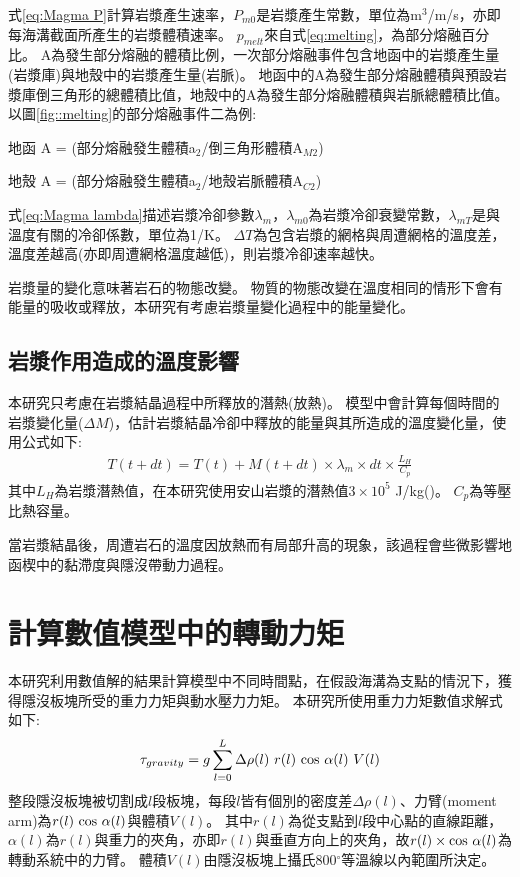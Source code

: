 式\ref{eq:Magma P}計算岩漿產生速率，$P_{m0}$是岩漿產生常數，單位為m$^3$/m/s，亦即每海溝截面所產生的岩漿體積速率。
$p_{melt}$來自式\ref{eq:melting}，為部分熔融百分比。
A為發生部分熔融的體積比例，一次部分熔融事件包含地函中的岩漿產生量(岩漿庫)與地殼中的岩漿產生量(岩脈)。
地函中的A為發生部分熔融體積與預設岩漿庫倒三角形的總體積比值，地殼中的A為發生部分熔融體積與岩脈總體積比值。
以圖\ref{fig::melting}的部分熔融事件二為例:

地函 A = (部分熔融發生體積a$_2$/倒三角形體積A$_{M2}$)

地殼 A = (部分熔融發生體積a$_2$/地殼岩脈體積A$_{C2}$)


式\ref{eq:Magma lambda}描述岩漿冷卻參數$\lambda_m$，$\lambda_{m0}$為岩漿冷卻衰變常數，$\lambda_{mT}$是與溫度有關的冷卻係數，單位為1/K。
$\Delta T$為包含岩漿的網格與周遭網格的溫度差，溫度差越高(亦即周遭網格溫度越低)，則岩漿冷卻速率越快。

岩漿量的變化意味著岩石的物態改變。
物質的物態改變在溫度相同的情形下會有能量的吸收或釋放，本研究有考慮岩漿量變化過程中的能量變化。
\subsection{岩漿作用造成的溫度影響}\label{岩漿作用造成的溫度影響}
本研究只考慮在岩漿結晶過程中所釋放的潛熱(放熱)。
模型中會計算每個時間的岩漿變化量($\Delta M$)，估計岩漿結晶冷卻中釋放的能量與其所造成的溫度變化量，使用公式如下:
\begin{align}
    T(t+dt) = T(t) + M(t+dt)\times \lambda_m \times dt \times \frac{L_H}{C_p}\label{eq:latent heat}
\end{align}
其中$L_H$為岩漿潛熱值，在本研究使用安山岩漿的潛熱值$3\times 10^5$ J/kg(\citealp{liu2011modeling})。
$C_p$為等壓比熱容量。

當岩漿結晶後，周遭岩石的溫度因放熱而有局部升高的現象，該過程會些微影響地函楔中的黏滯度與隱沒帶動力過程。

\section{計算數值模型中的轉動力矩}\label{計算數值模型中的轉動力矩}
本研究利用數值解的結果計算模型中不同時間點，在假設海溝為支點的情況下，獲得隱沒板塊所受的重力力矩與動水壓力力矩。
本研究所使用重力力矩數值求解式如下:
\begin{align}
    \tau_{gravity} =  g\sum ^L_{l=0} \Delta \rho(l)\ r(l)\ {\rm cos}\ \alpha (l)\ V(l) 
    \label{eqn:tau_gravity}
\end{align}
整段隱沒板塊被切割成$l$段板塊，每段$l$皆有個別的密度差$\Delta \rho(l)$、力臂(moment arm)為$r(l)\ {\rm cos}\ \alpha (l)$與體積$V(l)$。
其中$r(l)$為從支點到$l$段中心點的直線距離，$ \alpha (l)$為$r(l)$與重力的夾角，亦即$r(l)$與垂直方向上的夾角，故$r(l)\times {\rm cos}\ \alpha (l)$為轉動系統中的力臂。
體積$V(l)$由隱沒板塊上攝氏800$^{\circ}$等溫線以內範圍所決定。

